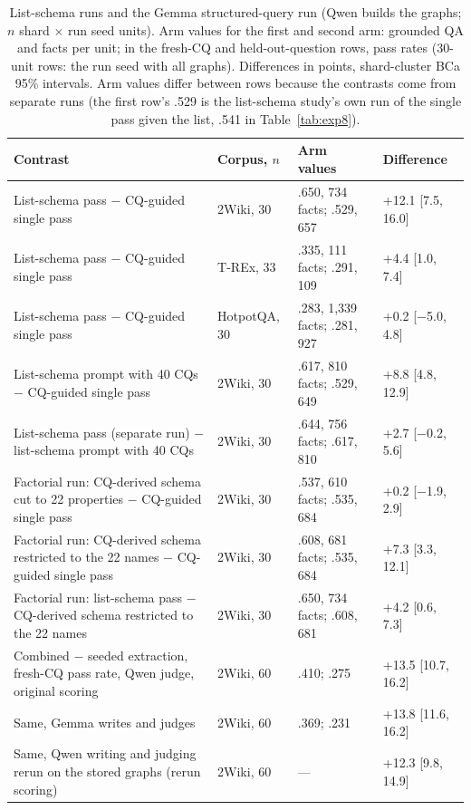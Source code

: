 \begin{table}[!ht]
\centering
\caption{List-schema runs and the Gemma structured-query run (Qwen builds the graphs; $n$ shard $\times$ run seed units). Arm values for the first and second arm: grounded QA and facts per unit; in the fresh-CQ and held-out-question rows, pass rates (30-unit rows: the run seed with all graphs). Differences in points, shard-cluster BCa 95\% intervals. Arm values differ between rows because the contrasts come from separate runs (the first row's .529 is the list-schema study's own run of the single pass given the list, .541 in Table~\ref{tab:exp8}).}
\label{tab:listschema}
\scriptsize\setlength{\tabcolsep}{3pt}
\begin{tabular}{P{7.8cm}P{2.0cm}P{4.2cm}P{3.0cm}}
\toprule
Contrast & Corpus, $n$ & Arm values & Difference \\
\midrule
List-schema pass $-$ CQ-guided single pass & 2Wiki, 30 & .650, 734 facts; .529, 657 & +12.1 [7.5, 16.0] \\
List-schema pass $-$ CQ-guided single pass & T-REx, 33 & .335, 111 facts; .291, 109 & +4.4 [1.0, 7.4] \\
List-schema pass $-$ CQ-guided single pass & HotpotQA, 30 & .283, 1,339 facts; .281, 927 & +0.2 [$-$5.0, 4.8] \\
List-schema prompt with 40 CQs $-$ CQ-guided single pass & 2Wiki, 30 & .617, 810 facts; .529, 649 & +8.8 [4.8, 12.9] \\
List-schema pass (separate run) $-$ list-schema prompt with 40 CQs & 2Wiki, 30 & .644, 756 facts; .617, 810 & +2.7 [$-$0.2, 5.6] \\
Factorial run: CQ-derived schema cut to 22 properties $-$ CQ-guided single pass & 2Wiki, 30 & .537, 610 facts; .535, 684 & +0.2 [$-$1.9, 2.9] \\
Factorial run: CQ-derived schema restricted to the 22 names $-$ CQ-guided single pass & 2Wiki, 30 & .608, 681 facts; .535, 684 & +7.3 [3.3, 12.1] \\
Factorial run: list-schema pass $-$ CQ-derived schema restricted to the 22 names & 2Wiki, 30 & .650, 734 facts; .608, 681 & +4.2 [0.6, 7.3] \\
Combined $-$ seeded extraction, fresh-CQ pass rate, Qwen judge, original scoring & 2Wiki, 60 & .410; .275 & +13.5 [10.7, 16.2] \\
Same, Gemma writes and judges & 2Wiki, 60 & .369; .231 & +13.8 [11.6, 16.2] \\
Same, Qwen writing and judging rerun on the stored graphs (rerun scoring) & 2Wiki, 60 & --- & +12.3 [9.8, 14.9] \\

\end{tabular}
\end{table}
